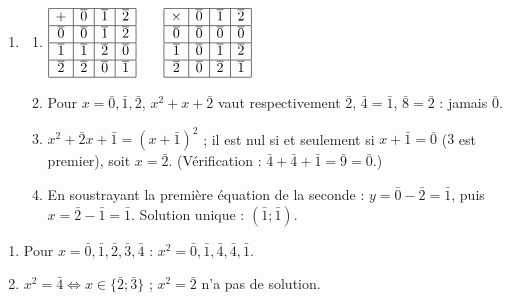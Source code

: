 \begin{corrige}
\begin{sol}
\begin{enumerate}
\begin{enumerate}
            De m\^eme $N \equiv a_0 + 3a_1 \ [9]$ et $0 \leq a_0 + 3a_1 \leq 8$ : $N$ est divisible par $9$ si et seulement si ses deux derniers chiffres sont $0$.
      \end{enumerate}
\item \begin{enumerate}
      \item 
      $\begin{array}{|c|c|c|c|}
      \hline + & \bar{0} & \bar{1} & \bar{2} \\ \hline
      \bar{0} & \bar{0} & \bar{1} & \bar{2} \\ \hline
      \bar{1} & \bar{1} & \bar{2} & \bar{0} \\ \hline
      \bar{2} & \bar{2} & \bar{0} & \bar{1} \\ \hline
      \end{array}
      \qquad
      \begin{array}{|c|c|c|c|}
      \hline \times & \bar{0} & \bar{1} & \bar{2} \\ \hline
      \bar{0} & \bar{0} & \bar{0} & \bar{0} \\ \hline
      \bar{1} & \bar{0} & \bar{1} & \bar{2} \\ \hline
      \bar{2} & \bar{0} & \bar{2} & \bar{1} \\ \hline
      \end{array}$
      \item Pour $x = \bar{0}, \bar{1}, \bar{2}$, $x^2 + x + \bar{2}$ vaut respectivement $\bar{2}$, $\bar{4} = \bar{1}$, $\bar{8} = \bar{2}$ : jamais $\bar{0}$.
      \item $x^2 + \bar{2}x + \bar{1} = (x + \bar{1})^2$ ; il est nul si et seulement si $x + \bar{1} = \bar{0}$ ($3$ est premier), soit $x = \bar{2}$.
            (V\'erification : $\bar{4} + \bar{4} + \bar{1} = \bar{9} = \bar{0}$.)
      \item En soustrayant la premi\`ere \'equation de la seconde : $y = \bar{0} - \bar{2} = \bar{1}$, puis $x = \bar{2} - \bar{1} = \bar{1}$.
            Solution unique : $(\bar{1} ; \bar{1})$.
      \end{enumerate}
\end{enumerate}
\end{sol}
%
\begin{sol}
\begin{enumerate}
\item Pour $x = \bar{0}, \bar{1}, \bar{2}, \bar{3}, \bar{4}$ : $x^2 = \bar{0}, \bar{1}, \bar{4}, \bar{4}, \bar{1}$.
\item $x^2 = \bar{4} \iff x \in \{ \bar{2} ; \bar{3} \}$ ; $x^2 = \bar{2}$ n'a pas de solution.

\end{enumerate}
\end{sol}
\end{corrige}
